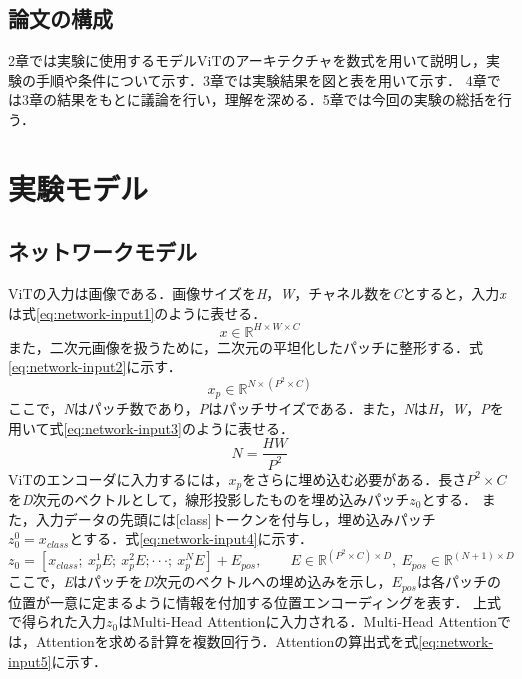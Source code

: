 \documentclass[a4paper, oneside, openany, dvipdfmx]{suribt}%
\newcommand{\eref}[1]{式\eqref{#1}}
\begin{document}
\section{論文の構成}
2章では実験に使用するモデルViTのアーキテクチャを数式を用いて説明し，実験の手順や条件について示す．3章では実験結果を図と表を用いて示す．
4章では3章の結果をもとに議論を行い，理解を深める．5章では今回の実験の総括を行う．

\chapter{実験モデル}

\section{ネットワークモデル}
ViTの入力は画像である．画像サイズを\textit{H}，\textit{W}，チャネル数を\textit{C}とすると，入力\textit{x}は\eref{eq:network-input1}のように表せる．
\begin{equation}
  x\in\mathbb{R}^{H\times W\times C}
  \label{eq:network-input1}
\end{equation}
また，二次元画像を扱うために，二次元の平坦化したパッチに整形する．\eref{eq:network-input2}に示す．
\begin{equation}
  x_{p}\in\mathbb{R}^{N\times(P^{2}\times C)}
  \label{eq:network-input2}
\end{equation}
ここで，\textit{N}はパッチ数であり，\textit{P}はパッチサイズである．また，\textit{N}は\textit{H}，\textit{W}，\textit{P}を用いて\eref{eq:network-input3}のように表せる．
\begin{equation}
  N=\frac{HW}{P^{2}}
  \label{eq:network-input3}
\end{equation}
ViTのエンコーダに入力するには，$x_{p}$をさらに埋め込む必要がある．長さ$P^{2}\times C$を\textit{D}次元のベクトルとして，線形投影したものを埋め込みパッチ$z_{0}$とする．
また，入力データの先頭には[class]トークンを付与し，埋め込みパッチ$z^{0}_{0}=x_{class}とする$．\eref{eq:network-input4}に示す．
\begin{equation}
  z_{0}=[x_{class};\ x^{1}_{p}E;\ x^{2}_{p}E;\cdot\cdot\cdot;\ x^{N}_{p}E]+E_{pos},\qquad E\in\mathbb{R}^{(P^{2}\times C)\times D},\ E_{pos}\in\mathbb{R}^{(N+1)\times D}
  \label{eq:network-input4}
\end{equation}
ここで，\textit{E}はパッチを\textit{D}次元のベクトルへの埋め込みを示し，$E_{pos}$は各パッチの位置が一意に定まるように情報を付加する位置エンコーディングを表す．
上式で得られた入力$z_{0}$はMulti-Head Attentionに入力される．Multi-Head Attentionでは，Attentionを求める計算を複数回行う．Attentionの算出式を\eref{eq:network-input5}に示す．
\end{document}
